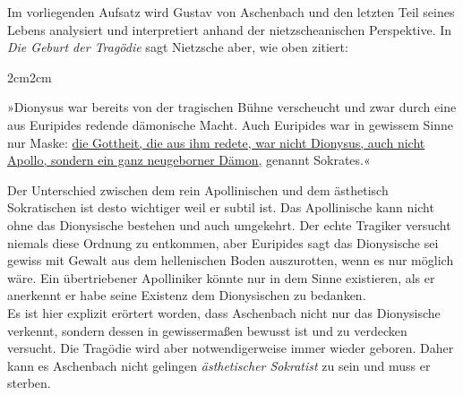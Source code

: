 \documentclass[12pt,a4paper]{article}
\newenvironment{longquote}
{%
    \vspace{-1.5em}
    \begin{adjustwidth}{2cm}{2cm}
        \fontsize{10}{12}\selectfont
        \singlespacing
        \itshape
    }
{%
    \end{adjustwidth}
}
\begin{document}
Im vorliegenden Aufsatz wird Gustav von Aschenbach und den letzten Teil seines Lebens analysiert und interpretiert anhand der nietzscheanischen Perspektive. In \textit{Die Geburt der Tragödie} sagt Nietzsche aber, wie oben zitiert:

\begin{longquote}
»Dionysus war bereits von der tragischen Bühne verscheucht und zwar durch eine aus Euripides redende dämonische Macht. Auch Euripides war in gewissem Sinne nur Maske: \uline{die Gottheit, die aus ihm redete, war nicht Dionysus, auch nicht Apollo, sondern ein ganz neugeborner Dämon,} genannt Sokrates.«\autocite[84–85]{nietzsche1920}
\end{longquote}

Der Unterschied zwischen dem rein Apollinischen und dem ästhetisch Sokratischen ist desto wichtiger weil er subtil ist. Das Apollinische kann nicht ohne das Dionysische bestehen und auch umgekehrt. Der echte Tragiker versucht niemals diese Ordnung zu entkommen, aber Euripides sagt das Dionysische sei gewiss mit Gewalt aus dem hellenischen Boden auszurotten, wenn es nur möglich wäre. Ein übertriebener Apolliniker könnte nur in dem Sinne existieren, als er anerkennt er habe seine Existenz dem Dionysischen zu bedanken.\\
Es ist hier explizit erörtert worden, dass Aschenbach nicht nur das Dionysische verkennt, sondern dessen in gewissermaßen bewusst ist und zu verdecken versucht. Die Tragödie wird aber notwendigerweise immer wieder geboren. Daher kann es Aschenbach nicht gelingen \textit{ästhetischer Sokratist} zu sein und muss er sterben.


\clearpage
\printbibliography[
    heading=bibintoc,
    title={Literaturverzeichnis}
]
\end{document}
